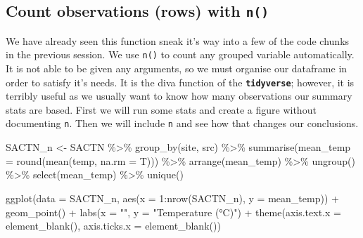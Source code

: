 \documentclass[
]{book}
\newenvironment{Shaded}{\begin{snugshade}}{\end{snugshade}}
\newcommand{\AttributeTok}[1]{\textcolor[rgb]{0.77,0.63,0.00}{#1}}
\newcommand{\DecValTok}[1]{\textcolor[rgb]{0.00,0.00,0.81}{#1}}
\newcommand{\FunctionTok}[1]{\textcolor[rgb]{0.00,0.00,0.00}{#1}}
\newcommand{\NormalTok}[1]{#1}
\newcommand{\OtherTok}[1]{\textcolor[rgb]{0.56,0.35,0.01}{#1}}
\newcommand{\SpecialCharTok}[1]{\textcolor[rgb]{0.00,0.00,0.00}{#1}}
\newcommand{\StringTok}[1]{\textcolor[rgb]{0.31,0.60,0.02}{#1}}
\begin{document}
\hypertarget{count-observations-rows-with-n}{%
\subsection{\texorpdfstring{Count observations (rows) with \texttt{n()}}{Count observations (rows) with n()}}\label{count-observations-rows-with-n}}

We have already seen this function sneak it's way into a few of the code chunks in the previous session. We use \texttt{n()} to count any grouped variable automatically. It is not able to be given any arguments, so we must organise our dataframe in order to satisfy it's needs. It is the diva function of the \textbf{\texttt{tidyverse}}; however, it is terribly useful as we usually want to know how many observations our summary stats are based. First we will run some stats and create a figure without documenting \texttt{n}. Then we will include \texttt{n} and see how that changes our conclusions.

\begin{Shaded}
\begin{Highlighting}[]
\NormalTok{ SACTN\_n }\OtherTok{\textless{}{-}}\NormalTok{ SACTN }\SpecialCharTok{\%\textgreater{}\%} 
  \FunctionTok{group\_by}\NormalTok{(site, src) }\SpecialCharTok{\%\textgreater{}\%} 
  \FunctionTok{summarise}\NormalTok{(}\AttributeTok{mean\_temp =} \FunctionTok{round}\NormalTok{(}\FunctionTok{mean}\NormalTok{(temp, }\AttributeTok{na.rm =}\NormalTok{ T))) }\SpecialCharTok{\%\textgreater{}\%} 
  \FunctionTok{arrange}\NormalTok{(mean\_temp) }\SpecialCharTok{\%\textgreater{}\%} 
  \FunctionTok{ungroup}\NormalTok{() }\SpecialCharTok{\%\textgreater{}\%} 
  \FunctionTok{select}\NormalTok{(mean\_temp) }\SpecialCharTok{\%\textgreater{}\%} 
  \FunctionTok{unique}\NormalTok{()}

\FunctionTok{ggplot}\NormalTok{(}\AttributeTok{data =}\NormalTok{ SACTN\_n, }\FunctionTok{aes}\NormalTok{(}\AttributeTok{x =} \DecValTok{1}\SpecialCharTok{:}\FunctionTok{nrow}\NormalTok{(SACTN\_n), }\AttributeTok{y =}\NormalTok{ mean\_temp)) }\SpecialCharTok{+}
  \FunctionTok{geom\_point}\NormalTok{() }\SpecialCharTok{+}
  \FunctionTok{labs}\NormalTok{(}\AttributeTok{x =} \StringTok{""}\NormalTok{, }\AttributeTok{y =} \StringTok{"Temperature (°C)"}\NormalTok{) }\SpecialCharTok{+}
  \FunctionTok{theme}\NormalTok{(}\AttributeTok{axis.text.x =} \FunctionTok{element\_blank}\NormalTok{(), }
        \AttributeTok{axis.ticks.x =} \FunctionTok{element\_blank}\NormalTok{())}
\end{Highlighting}
\end{Shaded}
\end{document}
